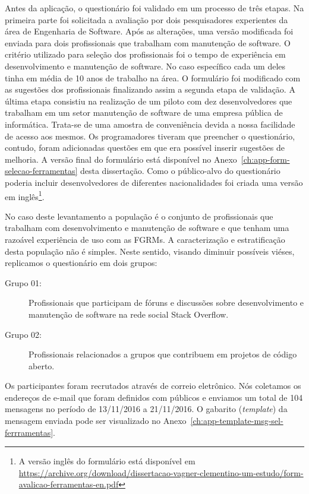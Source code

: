 Antes da aplicação, o questionário foi validado em um processo de três etapas.
Na primeira parte foi solicitada a avaliação por dois pesquisadores experientes
da área de Engenharia de Software. Após as alterações, uma versão modificada
foi enviada para dois profissionais que trabalham com manutenção de software. O
critério utilizado para seleção dos profissionais foi o tempo de experiência em
desenvolvimento e manutenção de software. No caso específico cada um deles
tinha em média de 10 anos de trabalho na área. O formulário foi modificado com
as sugestões dos profissionais finalizando assim a segunda etapa de validação.
A última etapa consistiu na realização de um piloto com dez desenvolvedores que
trabalham em um setor manutenção de software de uma empresa pública de
informática. Trata-se de uma amostra de conveniência devida a nossa facilidade
de acesso aos mesmos. Os programadores tiveram que preencher o questionário,
contudo, foram adicionadas questões em que era possível inserir sugestões de
melhoria. A versão final do formulário está disponível no
Anexo~\ref{ch:app-form-selecao-ferramentas} desta dissertação. Como o
público-alvo do questionário poderia incluir desenvolvedores de diferentes
nacionalidades foi criada uma versão em inglês\footnote{A versão inglês do
    formulário está disponível em
    \url{https://archive.org/download/dissertacao-vagner-clementino-um-estudo/form-avalicao-ferramentas-en.pdf}}.

No caso deste levantamento a população é o conjunto de profissionais que
trabalham com desenvolvimento e manutenção de software e que tenham uma
razoável experiência de uso com as FGRMs. A caracterização e estratificação
desta população não é simples. Neste sentido, visando diminuir possíveis
viéses, replicamos o questionário em dois grupos:

\begin{description}
	\item[Grupo 01:] Profissionais que participam de fóruns e discussões sobre
		desenvolvimento e manutenção de software na rede social Stack Overflow.
	\item[Grupo 02:] Profissionais relacionados a grupos que contribuem em
		projetos de código aberto.
\end{description}

Os participantes foram recrutados através de correio eletrônico. Nós coletamos
os endereços de e-mail que foram definidos com públicos e enviamos um total de
104 mensagens no período de 13/11/2016 a 21/11/2016. O gabarito
(\textit{template}) da mensagem enviada pode ser visualizado no
Anexo~\ref{ch:app-template-msg-sel-ferrramentas}.

